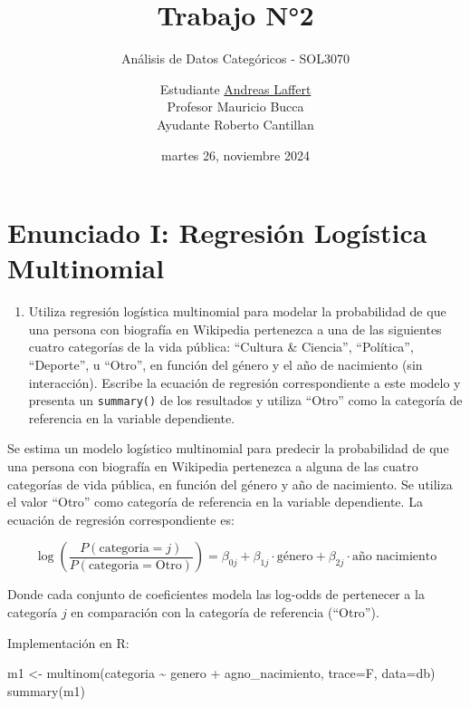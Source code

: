 \documentclass[
  12pt,
  a4paper,
]{article}
\title{\vspace{5cm} Trabajo N°2}
\subtitle{Análisis de Datos Categóricos - SOL3070}
\author{Estudiante \href{mailto:alaffertt@estudiante.uc.cl}{Andreas Laffert}\\
Profesor Mauricio Bucca\\
Ayudante Roberto Cantillan\\
\vspace{8cm}}
\date{martes 26, noviembre 2024}
\newenvironment{Shaded}{\begin{snugshade}}{\end{snugshade}}
\newcommand{\AttributeTok}[1]{\textcolor[rgb]{0.77,0.63,0.00}{#1}}
\newcommand{\FunctionTok}[1]{\textcolor[rgb]{0.00,0.00,0.00}{#1}}
\newcommand{\NormalTok}[1]{#1}
\newcommand{\OtherTok}[1]{\textcolor[rgb]{0.56,0.35,0.01}{#1}}
\newcommand{\SpecialCharTok}[1]{\textcolor[rgb]{0.00,0.00,0.00}{#1}}
\providecommand{\tightlist}{%
  \setlength{\itemsep}{0pt}\setlength{\parskip}{0pt}}
\begin{document}
\maketitle

\pagebreak

\hypertarget{enunciado-i-regresiuxf3n-loguxedstica-multinomial}{%
\section{Enunciado I: Regresión Logística Multinomial}\label{enunciado-i-regresiuxf3n-loguxedstica-multinomial}}

\begin{enumerate}
\def\labelenumi{\arabic{enumi}.}
\tightlist
\item
  Utiliza regresión logística multinomial para modelar la probabilidad de que una persona con biografía en Wikipedia pertenezca a una de las siguientes cuatro categorías de la vida pública: ``Cultura \& Ciencia'', ``Política'', ``Deporte'', u ``Otro'', en función del género y el año de nacimiento (sin interacción). Escribe la ecuación de regresión correspondiente a este modelo y presenta un \texttt{summary()} de los resultados y utiliza ``Otro'' como la categoría de referencia en la variable dependiente.
\end{enumerate}

Se estima un modelo logístico multinomial para predecir la probabilidad de que una persona con biografía en Wikipedia pertenezca a alguna de las cuatro categorías de vida pública, en función del género y año de nacimiento. Se utiliza el valor ``Otro'' como categoría de referencia en la variable dependiente. La ecuación de regresión correspondiente es:

\[
\log\left(\frac{P(\text{categoria} = j)}{P(\text{categoria} = \text{Otro})}\right) = \beta_{0j} + \beta_{1j} \cdot \text{género} + \beta_{2j} \cdot \text{año nacimiento}
\]

Donde cada conjunto de coeficientes modela las log-odds de pertenecer a la categoría \(j\) en comparación con la categoría de referencia (``Otro'').

Implementación en R:

\begin{Shaded}
\begin{Highlighting}[]
\NormalTok{m1 }\OtherTok{\textless{}{-}} \FunctionTok{multinom}\NormalTok{(categoria }\SpecialCharTok{\textasciitilde{}}\NormalTok{ genero }\SpecialCharTok{+}\NormalTok{ agno\_nacimiento, }
               \AttributeTok{trace=}\NormalTok{F, }\AttributeTok{data=}\NormalTok{db)}
\FunctionTok{summary}\NormalTok{(m1)}
\end{Highlighting}
\end{Shaded}
\end{document}
